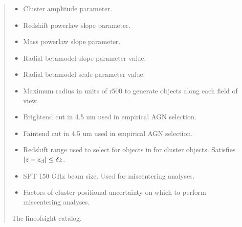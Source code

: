 \documentclass[letterpaper,12pt,english]{sphinxmanual}
\begin{document}
\begin{fulllineitems}
\begin{fulllineitems}
\begin{quote}
\begin{description}
\begin{itemize}
\item {} 
\sphinxAtStartPar
{} \textendash{} Cluster amplitude parameter.

\item {} 
\sphinxAtStartPar
{} \textendash{} Redshift power\sphinxhyphen{}law slope parameter.

\item {} 
\sphinxAtStartPar
{} \textendash{} Mass power\sphinxhyphen{}law slope parameter.

\item {} 
\sphinxAtStartPar
{} \textendash{} Radial beta\sphinxhyphen{}model slope parameter value.

\item {} 
\sphinxAtStartPar
{} \textendash{} Radial beta\sphinxhyphen{}model scale parameter value.

\item {} 
\sphinxAtStartPar
{} \textendash{} Maximum radius in units of r500 to generate objects along each field of view.

\item {} 
\sphinxAtStartPar
{} \textendash{} Bright\sphinxhyphen{}end cut in 4.5 um used in empirical AGN selection.

\item {} 
\sphinxAtStartPar
{} \textendash{} Faint\sphinxhyphen{}end cut in 4.5 um used in empirical AGN selection.

\item {} 
\sphinxAtStartPar
{} \textendash{} Redshift range used to select for objects in  for cluster objects. Satisfies
\(|z - z_{\rm cl}| \leq \delta z\).

\item {} 
\sphinxAtStartPar
{} \textendash{} SPT 150 GHz beam size. Used for miscentering analyses.

\item {} 
\sphinxAtStartPar
{} \textendash{} Factors of cluster positional uncertainty on which to perform miscentering analyses.

\end{itemize}

\sphinxAtStartPar
The line\sphinxhyphen{}of\sphinxhyphen{}sight catalog.


\end{description}
\end{quote}
\end{fulllineitems}
\end{fulllineitems}
\end{document}
